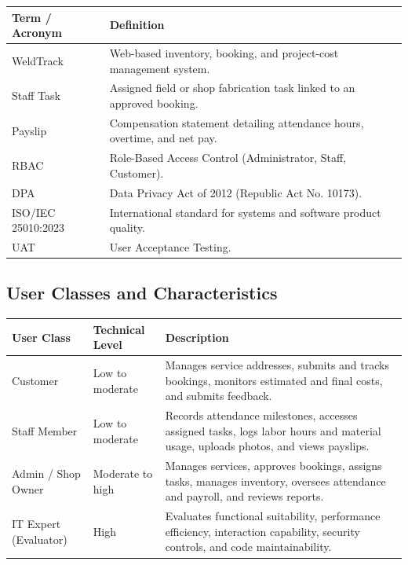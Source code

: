 \documentclass[12pt, letterpaper]{article}
\begin{document}
\begin{table}[h]
\centering

\begin{tabular}{p{6cm} p{6cm}}
\toprule
\textbf{Term / Acronym} & \textbf{Definition} \\
\midrule
WeldTrack & Web-based inventory, booking, and project-cost management system. \\
Staff Task & Assigned field or shop fabrication task linked to an approved booking. \\
Payslip & Compensation statement detailing attendance hours, overtime, and net pay. \\
RBAC & Role-Based Access Control (Administrator, Staff, Customer). \\
DPA & Data Privacy Act of 2012 (Republic Act No. 10173). \\
ISO/IEC 25010:2023 & International standard for systems and software product quality. \\
UAT & User Acceptance Testing. \\
\bottomrule
\end{tabular}
\end{table}

\subsection*{User Classes and Characteristics}



\begin{table}[h]
\centering

\begin{tabular}{p{3.5cm} p{4.5cm} p{6cm}}
\toprule
\textbf{User Class} & \textbf{Technical Level} & \textbf{Description}  \\
\midrule
Customer & Low to moderate & Manages service addresses, submits and tracks bookings, monitors estimated and final costs, and submits feedback.\\
Staff Member & Low to moderate & Records attendance milestones, accesses assigned tasks, logs labor hours and material usage, uploads photos, and views payslips.\\
Admin / Shop Owner & Moderate to high & Manages services, approves bookings, assigns tasks, manages inventory, oversees attendance and payroll, and reviews reports.\\
IT Expert (Evaluator) & High & Evaluates functional suitability, performance efficiency, interaction capability, security controls, and code maintainability.\\
\bottomrule
\end{tabular}
\end{table}
\end{document}
